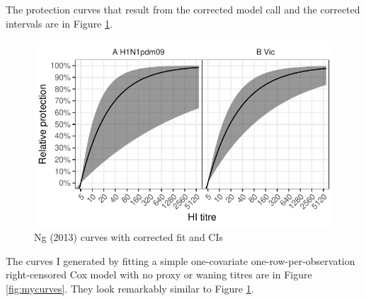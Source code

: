 \documentclass[]{article}
\newenvironment{Shaded}{\begin{snugshade}}{\end{snugshade}}
\newcommand{\DataTypeTok}[1]{\textcolor[rgb]{0.13,0.29,0.53}{#1}}
\newcommand{\DecValTok}[1]{\textcolor[rgb]{0.00,0.00,0.81}{#1}}
\newcommand{\KeywordTok}[1]{\textcolor[rgb]{0.13,0.29,0.53}{\textbf{#1}}}
\newcommand{\NormalTok}[1]{#1}
\newcommand{\OperatorTok}[1]{\textcolor[rgb]{0.81,0.36,0.00}{\textbf{#1}}}
\newcommand{\StringTok}[1]{\textcolor[rgb]{0.31,0.60,0.02}{#1}}
\begin{document}
\begin{Shaded}
\end{Shaded}

The protection curves that result from the corrected model call and the corrected intervals are in Figure \ref{fig:cimodcurves}.

\begin{figure}
\centering
\includegraphics{../fit-cox-plot/sophia-ci-mod.pdf}
\caption{\label{fig:cimodcurves}Ng (2013) curves with corrected fit and CIs}
\end{figure}

The curves I generated by fitting a simple one-covariate one-row-per-observation right-censored Cox model with no proxy or waning titres are in Figure \ref{fig:mycurves}. They look remarkably similar to Figure \ref{fig:cimodcurves}.
\end{document}
